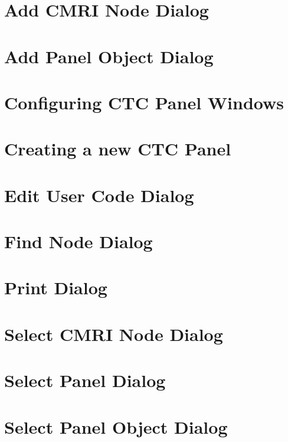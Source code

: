 \section{Add CMRI Node Dialog}
\section{Add Panel Object Dialog}
\section{Configuring CTC Panel Windows}
\section{Creating a new CTC Panel}
\section{Edit User Code Dialog}
\section{Find Node Dialog}
\section{Print Dialog}
\section{Select CMRI Node Dialog}
\section{Select Panel Dialog}
\section{Select Panel Object Dialog}


